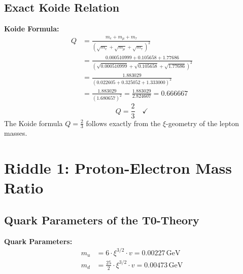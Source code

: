 	\subsection{Exact Koide Relation}
	\textbf{Koide Formula:}
	\begin{align}
		Q &= \frac{m_e + m_\mu + m_\tau}{(\sqrt{m_e} + \sqrt{m_\mu} + \sqrt{m_\tau})^2} \\
		&= \frac{0.000510999 + 0.105658 + 1.77686}{(\sqrt{0.000510999} + \sqrt{0.105658} + \sqrt{1.77686})^2} \\
		&= \frac{1.883029}{(0.022605 + 0.325052 + 1.333000)^2} \\
		&= \frac{1.883029}{(1.680657)^2} = \frac{1.883029}{2.824607} = 0.666667
	\end{align}
	\begin{equation}
		Q = \frac{2}{3} \quad \checkmark
	\end{equation}
	The Koide formula $Q = \frac{2}{3}$ follows exactly from the $\xi$-geometry of the lepton masses.
	\section{Riddle 1: Proton-Electron Mass Ratio}
	\subsection{Quark Parameters of the T0-Theory}
	\textbf{Quark Parameters:}
	\begin{align}
		m_u &= 6 \cdot \xi^{3/2} \cdot v = 0.00227\,\si{\giga\electronvolt} \\
		m_d &= \frac{25}{2} \cdot \xi^{3/2} \cdot v = 0.00473\,\si{\giga\electronvolt}
	\end{align}
